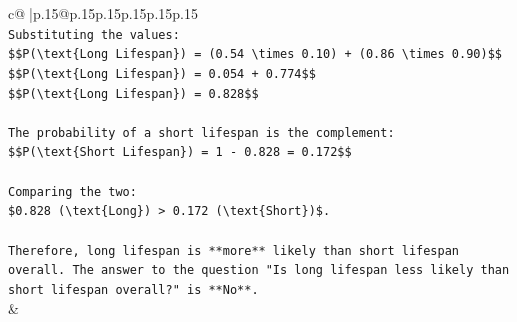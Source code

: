 \documentclass{article}
\begin{document}
{\begin{supertabular}{c@{$\;$}|p{.15\linewidth}@{}p{.15\linewidth}p{.15\linewidth}p{.15\linewidth}p{.15\linewidth}p{.15\linewidth}}
{{{\\ 
\texttt{Substituting the values:} \\
\texttt{\$\$P(\textbackslash{}text\{Long Lifespan\}) = (0.54 \textbackslash{}times 0.10) + (0.86 \textbackslash{}times 0.90)\$\$} \\
\texttt{\$\$P(\textbackslash{}text\{Long Lifespan\}) = 0.054 + 0.774\$\$} \\
\texttt{\$\$P(\textbackslash{}text\{Long Lifespan\}) = 0.828\$\$} \\
\\ 
\texttt{The probability of a short lifespan is the complement:} \\
\texttt{\$\$P(\textbackslash{}text\{Short Lifespan\}) = 1 {-} 0.828 = 0.172\$\$} \\
\\ 
\texttt{Comparing the two:} \\
\texttt{\$0.828 (\textbackslash{}text\{Long\}) > 0.172 (\textbackslash{}text\{Short\})\$.} \\
\\ 
\texttt{Therefore, long lifespan is **more** likely than short lifespan overall. The answer to the question "Is long lifespan less likely than short lifespan overall?" is **No**.} \\
            }
        }
    }
    & \\ \\


\end{supertabular}}
\end{document}
